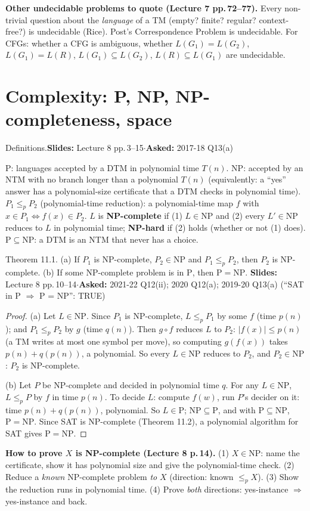 \documentclass[10.5pt,a4paper]{article}
\newcommand{\src}[2]{{\footnotesize\color{gray!70!black}\textbf{Slides:} #1\enspace$\cdot$\enspace\textbf{Asked:} #2}\par}
\newcommand{\NP}{\mathrm{NP}}
\renewcommand{\P}{\mathrm{P}}
\begin{document}
\textbf{Other undecidable problems to quote (Lecture 7 pp.\,72--77).} Every non-trivial question about the \emph{language} of a TM
(empty? finite? regular? context-free?) is undecidable (Rice). Post's Correspondence Problem is undecidable. For CFGs: whether a CFG is ambiguous,
whether $L(G_1)=L(G_2)$, $L(G_1)=L(R)$, $L(G_1)\subseteq L(G_2)$, $L(R)\subseteq L(G_1)$ are undecidable.

\section{Complexity: P, NP, NP-completeness, space}

\begin{thm}{Definitions.}\src{Lecture 8 pp.\,3--15}{2017-18 Q13(a)}\end{thm}
$\P$: languages accepted by a DTM in polynomial time $T(n)$. $\NP$: accepted by an NTM with no branch longer than a polynomial $T(n)$
(equivalently: a ``yes'' answer has a polynomial-size certificate that a DTM checks in polynomial time). $P_1\le_pP_2$ (polynomial-time
reduction): a polynomial-time map $f$ with $x\in P_1\iff f(x)\in P_2$. $L$ is \textbf{NP-complete} if (1) $L\in\NP$ and (2) every $L'\in\NP$
reduces to $L$ in polynomial time; \textbf{NP-hard} if (2) holds (whether or not (1) does). $\P\subseteq\NP$: a DTM is an NTM that never has
a choice.

\begin{thm}{Theorem 11.1. (a) If $P_1$ is NP-complete, $P_2\in\NP$ and $P_1\le_pP_2$, then $P_2$ is NP-complete.
(b) If some NP-complete problem is in $\P$, then $\P=\NP$.}
\src{Lecture 8 pp.\,10--14}{2021-22 Q12(ii); 2020 Q12(a); 2019-20 Q13(a) (``SAT in P $\Rightarrow$ P = NP'': TRUE)}\end{thm}
\begin{proof}
(a) Let $L\in\NP$. Since $P_1$ is NP-complete, $L\le_pP_1$ by some $f$ (time $p(n)$); and $P_1\le_pP_2$ by $g$ (time $q(n)$). Then $g\circ f$ reduces
$L$ to $P_2$: $|f(x)|\le p(n)$ (a TM writes at most one symbol per move), so computing $g(f(x))$ takes $p(n)+q(p(n))$, a polynomial. So every
$L\in\NP$ reduces to $P_2$, and $P_2\in\NP$: $P_2$ is NP-complete.

(b) Let $P$ be NP-complete and decided in polynomial time $q$. For any $L\in\NP$, $L\le_pP$ by $f$ in time $p(n)$. To decide $L$: compute
$f(w)$, run $P$'s decider on it: time $p(n)+q(p(n))$, polynomial. So $L\in\P$; $\NP\subseteq\P$, and with $\P\subseteq\NP$, $\P=\NP$. Since SAT
is NP-complete (Theorem 11.2), a polynomial algorithm for SAT gives $\P=\NP$.
\end{proof}
\begin{trap}\textbf{How to prove $X$ is NP-complete (Lecture 8 p.\,14).} (1) $X\in\NP$: name the certificate, show it has polynomial size and
give the polynomial-time check. (2) Reduce a \emph{known} NP-complete problem \emph{to} $X$ (direction: known $\le_p X$). (3) Show the reduction
runs in polynomial time. (4) Prove \emph{both} directions: yes-instance $\Rightarrow$ yes-instance and back.\end{trap}
\end{document}
